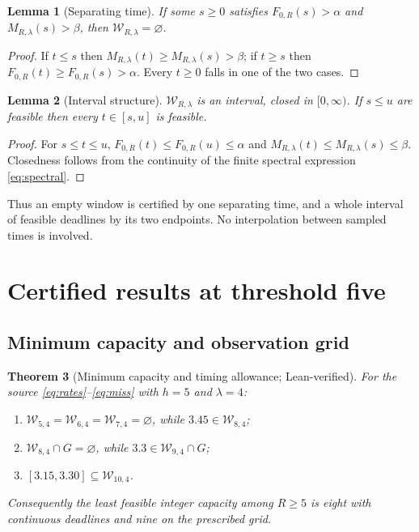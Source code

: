 \documentclass[11pt,a4paper]{article}
\theoremstyle{plain}
\newtheorem{theorem}{Theorem}[section]
\newtheorem{lemma}[theorem]{Lemma}
\theoremstyle{definition}
\theoremstyle{remark}
\newcommand{\Wc}{\mathcal W}
\begin{document}
\begin{lemma}[Separating time]\label{lem:separating}
If some $s\ge0$ satisfies $F_{0,R}(s)>\alpha$ and $M_{R,\lambda}(s)>\beta$, then $\Wc_{R,\lambda}=\varnothing$.
\end{lemma}
\begin{proof}
If $t\le s$ then $M_{R,\lambda}(t)\ge M_{R,\lambda}(s)>\beta$; if $t\ge s$ then $F_{0,R}(t)\ge F_{0,R}(s)>\alpha$. Every $t\ge0$ falls in one of the two cases.
\end{proof}

\begin{lemma}[Interval structure]\label{lem:interval}
$\Wc_{R,\lambda}$ is an interval, closed in $[0,\infty)$. If $s\le u$ are feasible then every $t\in[s,u]$ is feasible.
\end{lemma}
\begin{proof}
For $s\le t\le u$, $F_{0,R}(t)\le F_{0,R}(u)\le\alpha$ and $M_{R,\lambda}(t)\le M_{R,\lambda}(s)\le\beta$. Closedness follows from the continuity of the finite spectral expression \eqref{eq:spectral}.
\end{proof}
Thus an empty window is certified by one separating time, and a whole interval of feasible deadlines by its two endpoints. No interpolation between sampled times is involved.

\section{Certified results at threshold five}\label{sec:certified}

\subsection{Minimum capacity and observation grid}
\begin{theorem}[Minimum capacity and timing allowance; Lean-verified]\label{thm:capacity}
For the source \eqref{eq:rates}--\eqref{eq:miss} with $h=5$ and $\lambda=4$:
\begin{enumerate}[label=(\alph*)]
\item $\Wc_{5,4}=\Wc_{6,4}=\Wc_{7,4}=\varnothing$, while $3.45\in\Wc_{8,4}$;
\item $\Wc_{8,4}\cap G=\varnothing$, while $3.3\in\Wc_{9,4}\cap G$;
\item $[3.15,3.30]\subseteq\Wc_{10,4}$.
\end{enumerate}
Consequently the least feasible integer capacity among $R\ge5$ is eight with continuous deadlines and nine on the prescribed grid.
\end{theorem}
\end{document}
